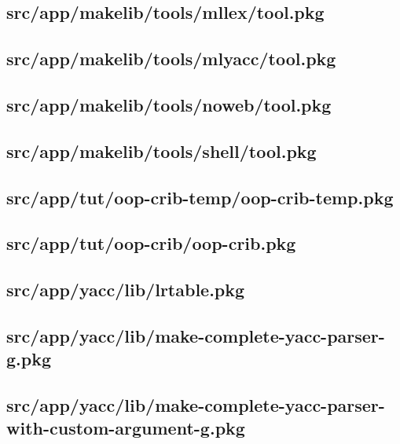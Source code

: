 \subsection{src/app/makelib/tools/mllex/tool.pkg}


\subsection{src/app/makelib/tools/mlyacc/tool.pkg}


\subsection{src/app/makelib/tools/noweb/tool.pkg}


\subsection{src/app/makelib/tools/shell/tool.pkg}


\subsection{src/app/tut/oop-crib-temp/oop-crib-temp.pkg}


\subsection{src/app/tut/oop-crib/oop-crib.pkg}


\subsection{src/app/yacc/lib/lrtable.pkg}


\subsection{src/app/yacc/lib/make-complete-yacc-parser-g.pkg}


\subsection{src/app/yacc/lib/make-complete-yacc-parser-with-custom-argument-g.pkg}


